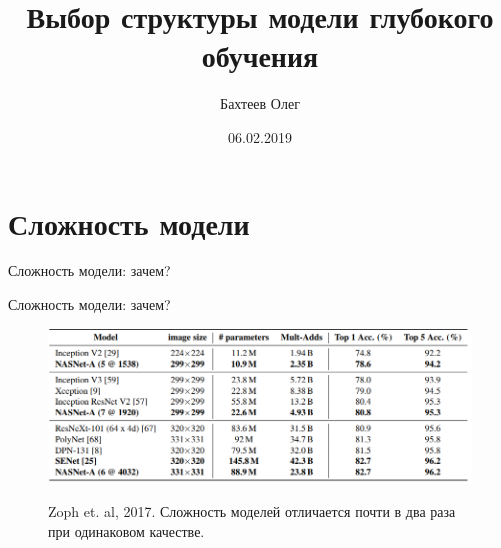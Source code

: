 \documentclass[usenames,dvipsnames,10pt,pdf,utf8,russian,aspectratio=43]{beamer}
\title[Выбор структуры]{Выбор структуры модели глубокого обучения}
\author{Бахтеев Олег}
\institute{МФТИ}
\date{06.02.2019}
\begin{document}
\begin{frame}
  \titlepage
\end{frame}


\section{Сложность модели}
\begin{frame}{Сложность модели: зачем?}
\begin{figure}
  \centering
\label{fig:1}\qquad

\end{figure}


\end{frame}

\begin{frame}{Сложность модели: зачем?}

\begin{figure}
  \centering
 {\includegraphics[width=\textwidth]{zoph.png}}
\label{fig:1}\qquad
\caption*{Zoph et. al, 2017.  Сложность моделей отличается почти в два раза при одинаковом качестве.}
\end{figure}
\end{frame}
\end{document}
